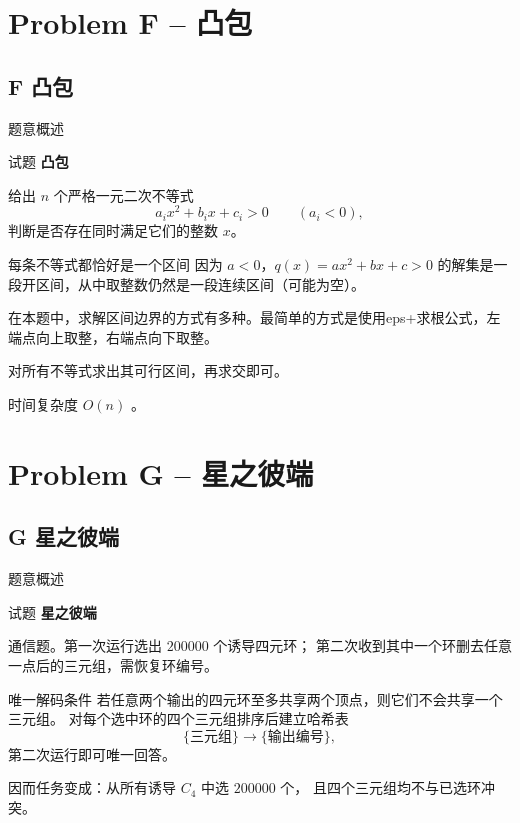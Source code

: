 \documentclass{beamer}
\newcommand{\TT}[1]{{\ttfamily #1}}
\newcommand{\BF}[1]{\textbf{#1}}
\begin{document}
{
\section[F]{Problem F -- 凸包}
\subsection{F 凸包}
\begin{frame}{题意概述}
  \begin{center}试题 \myboxvi{\BF{\TT{F}}} \BF{凸包}\end{center}
  给出 $n$ 个严格一元二次不等式
  \[
    a_ix^2+b_ix+c_i>0\qquad(a_i<0),
  \]
  判断是否存在同时满足它们的整数 $x$。
\end{frame}


\begin{frame}{每条不等式都恰好是一个区间}
因为 $a<0$，$q(x)=ax^2+bx+c>0$ 的解集是一段开区间，从中取整数仍然是一段连续区间（可能为空）。

在本题中，求解区间边界的方式有多种。最简单的方式是使用eps+求根公式，左端点向上取整，右端点向下取整。

对所有不等式求出其可行区间，再求交即可。

时间复杂度 $O(n)$ 。
\end{frame}

{
\section[G]{Problem G -- 星之彼端}
\subsection{G 星之彼端}
\begin{frame}{题意概述}
  \begin{center}试题 \myboxvii{\BF{\TT{G}}} \BF{星之彼端}\end{center}
  通信题。第一次运行选出 $200000$ 个诱导四元环；
  第二次收到其中一个环删去任意一点后的三元组，需恢复环编号。
\end{frame}


\begin{frame}{唯一解码条件}
  若任意两个输出的四元环至多共享两个顶点，则它们不会共享一个三元组。
  对每个选中环的四个三元组排序后建立哈希表
  \[
    \{\text{三元组}\}\longrightarrow\{\text{输出编号}\},
  \]
  第二次运行即可唯一回答。

  \vspace{0.5em}
  因而任务变成：从所有诱导 $C_4$ 中选 $200000$ 个，
  且四个三元组均不与已选环冲突。
\end{frame}

}}
\end{document}
